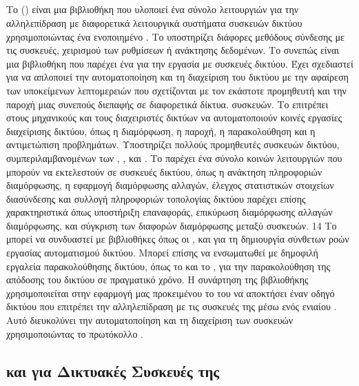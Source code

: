 \subsection{}
Το  () είναι μια βιβλιοθήκη  που υλοποιεί ένα σύνολο λειτουργιών για την αλληλεπίδραση με διαφορετικά λειτουργικά συστήματα συσκευών δικτύου χρησιμοποιώντας ένα ενοποιημένο .
Το  υποστηρίζει διάφορες μεθόδους σύνδεσης με τις συσκευές, χειρισμού των ρυθμίσεων ή ανάκτησης δεδομένων. Το  συνεπώς είναι μια βιβλιοθήκη  που παρέχει ένα 
 για την εργασία με συσκευές δικτύου. Έχει σχεδιαστεί για να απλοποιεί την
αυτοματοποίηση και τη διαχείριση του δικτύου με την αφαίρεση των υποκείμενων λεπτομερειών που σχετίζονται με τον εκάστοτε προμηθευτή και την παροχή μιας συνεπούς διεπαφής σε διαφορετικά δίκτυα. 
συσκευών.
Το  επιτρέπει στους μηχανικούς και τους διαχειριστές δικτύων να αυτοματοποιούν κοινές εργασίες διαχείρισης δικτύου, όπως η διαμόρφωση, η παροχή, η παρακολούθηση και η 
αντιμετώπιση προβλημάτων. Υποστηρίζει πολλούς προμηθευτές συσκευών δικτύου, συμπεριλαμβανομένων των , ,  και .
Το  παρέχει ένα σύνολο κοινών λειτουργιών που μπορούν να εκτελεστούν σε συσκευές δικτύου, όπως η ανάκτηση πληροφοριών διαμόρφωσης, η εφαρμογή διαμόρφωσης 
αλλαγών, έλεγχος στατιστικών στοιχείων διασύνδεσης και συλλογή πληροφοριών τοπολογίας δικτύου παρέχει επίσης χαρακτηριστικά όπως υποστήριξη επαναφοράς, επικύρωση διαμόρφωσης 
αλλαγών διαμόρφωσης, και σύγκριση των διαφορών διαμόρφωσης μεταξύ συσκευών.
14
Το  μπορεί να συνδυαστεί με βιβλιοθήκες  όπως οι ,  και  για τη δημιουργία σύνθετων ροών εργασίας αυτοματισμού δικτύου. Μπορεί επίσης να ενσωματωθεί με δημοφιλή εργαλεία παρακολούθησης δικτύου, όπως το  και το , για την παρακολούθηση της απόδοσης του δικτύου σε πραγματικό χρόνο. Η συνάρτηση  της βιβλιοθήκης  χρησιμοποιείται στην εφαρμογή μας  προκειμένου το   του   να αποκτήσει έναν οδηγό δικτύου που επιτρέπει την αλληλεπίδραση με τις συσκευές της  μέσω ενός ενιαίου . Αυτό διευκολύνει την αυτοματοποίηση και τη διαχείριση των συσκευών χρησιμοποιώντας το πρωτόκολλο .


\subsection{ και  για Δικτυακές Συσκευές της   }

